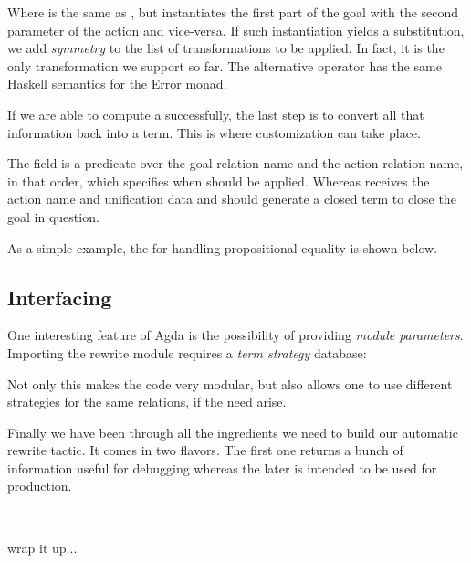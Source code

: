 
Where  is the same as , but instantiates the first part of the goal with the second parameter of the action and vice-versa. If such instantiation yields a substitution, we add \emph{symmetry} to the list of
transformations to be applied. In fact, it is the only transformation we support so far. The alternative operator has the same Haskell semantics for
the Error monad.

If we are able to compute a  successfully, the last step is to convert
all that information back into a term. This is where customization can take place.


The  field is a predicate over the goal relation name and the action relation name, in that order, which specifies when  should be applied.
Whereas  receives the action name and unification data and should generate a closed term to close the goal in question.

As a simple example, the  for handling propositional equality is shown below.


\subsection{Interfacing}

One interesting feature of Agda is the possibility of providing \emph{module parameters}. Importing the rewrite module requires a \emph{term strategy} database:


Not only this makes the code very modular, but also allows one to use different strategies for the same relations, if the need arise.

Finally we have been through all the ingredients we need to build our automatic rewrite tactic. It comes in two flavors. The first one
returns a bunch of information useful for debugging whereas the
later is intended to be used for production.

\\

\begin{TODO}
  \item wrap it up...
\end{TODO}


